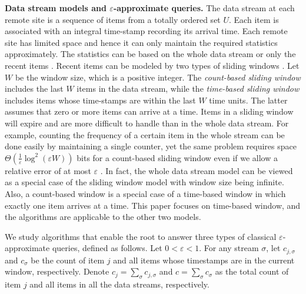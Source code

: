\documentclass[proceedings]{stacs}
\theoremstyle{definition}\newtheorem{fact}{Fact}
\begin{document}
\vspace{0.5ex}
{\bf Data stream models and {\boldmath $\varepsilon$}-approximate queries.}
The data stream at
each remote site is a sequence of items from a totally ordered set $U$.
Each item is associated with
an integral time-stamp recording its  {arrival} time.
Each remote site has limited space and hence it
can only maintain the required statistics approximately.
The statistics can be
based on the whole data stream
\cite{AlonMS02,Indyk00,GuhaKS01,DemaineLM02} or
only the recent items
\cite{DatarM02,ArasuM04,LeeT06b}.
Recent items can be modeled by two types of sliding windows
\cite{BabcockDM02,DatarGIM02}.
Let $W$ be the window size, which is a positive integer.
The \emph{count-based sliding window}
includes the last $W$ items in the data stream, while the
\emph{time-based sliding window}
includes items whose time-stamps are within the last $W$ time units.
The latter assumes that zero or more items can arrive at a time.
Items in a sliding window will expire and are more
difficult to handle than in the whole data stream.
For example, counting the frequency of a
certain item in the whole stream
can be done easily by maintaining a single counter, yet the same
problem requires space
$\Theta(\frac{1}{\varepsilon} \log^2 (\varepsilon W))$ bits
for a count-based sliding window
even if we allow a relative error of at most $\varepsilon$
\cite{DatarGIM02, GibbonsT02}.  In fact, the whole data stream model
can be viewed as a special case of the sliding window model with
window size being infinite.  Also,
a count-based window is a special case of a time-based
  window in which exactly one item arrives at a time.
This paper focuses on time-based window, and
the algorithms are applicable to the other two models.

We study algorithms that enable the root to answer
three types of classical
$\varepsilon$-approximate queries, defined as follows.
Let $0 < \varepsilon < 1$. For any stream $\sigma$,
let $c_{j,\sigma}$
and $c_\sigma$ be the count of
item $j$ and all items
  {whose timestamps are} in the current window,
respectively.
Denote $c_j = \sum_\sigma c_{j,\sigma}$ and $c = \sum_\sigma c_\sigma$
as the total count of item $j$ and all items in all the data streams,
respectively.
\end{document}

